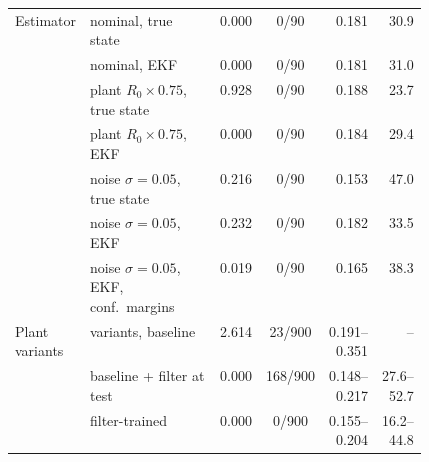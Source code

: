 {\begin{tabular}{>{\raggedright\arraybackslash}p{0.15\linewidth}>{\raggedright\arraybackslash}p{0.33\linewidth}rcrr}
\midrule
Estimator & nominal, true state & 0.000 & 0/90 & 0.181 & 30.9 \\
 & nominal, EKF & 0.000 & 0/90 & 0.181 & 31.0 \\
 & plant $R_0\times0.75$, true state & 0.928 & 0/90 & 0.188 & 23.7 \\
 & plant $R_0\times0.75$, EKF & 0.000 & 0/90 & 0.184 & 29.4 \\
 & noise $\sigma=0.05$, true state & 0.216 & 0/90 & 0.153 & 47.0 \\
 & noise $\sigma=0.05$, EKF & 0.232 & 0/90 & 0.182 & 33.5 \\
 & noise $\sigma=0.05$, EKF, conf.\ margins & 0.019 & 0/90 & 0.165 & 38.3 \\
\midrule
Plant variants & 10 variants, baseline & 2.614 & 23/900 & 0.191--0.351 & -- \\
 & baseline + filter at test & 0.000 & 168/900 & 0.148--0.217 & 27.6--52.7 \\
 & filter-trained & 0.000 & 0/900 & 0.155--0.204 & 16.2--44.8 \\
\bottomrule\end{tabular}}
